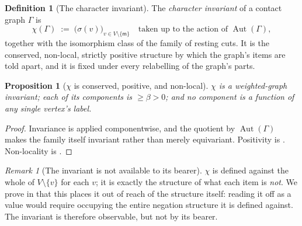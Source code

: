 \documentclass[11pt,twocolumn,a4paper]{article}
\theoremstyle{dirthm}
\newtheorem{proposition}[theorem]{Proposition}
\theoremstyle{definition}
\newtheorem{definition}[theorem]{Definition}
\theoremstyle{remark}
\newtheorem{remark}[theorem]{Remark}
\newcommand{\Gph}{\Gamma}
\newcommand{\V}{V}
\newcommand{\med}{\mathsf{m}}
\newcommand{\flo}{\beta}
\newcommand{\str}{\sigma}
\newcommand{\Char}{\chi}
\newcommand{\set}[1]{\{#1\}}
\DeclareMathOperator{\Aut}{Aut}
\begin{document}
\begin{definition}[The character invariant]
\label{def:char}
The \emph{character invariant} of a contact graph $\Gph$ is
\[
\Char(\Gph)\;:=\;\bigl(\str(v)\bigr)_{v\in\V\setminus\set{\med}}
\quad\text{taken up to the action of }\Aut(\Gph),
\]
together with the isomorphism class of the family of resting cuts. It is the
conserved, non-local, strictly positive structure by which the graph's items
are told apart, and it is fixed under every relabelling of the graph's parts.
\end{definition}

\begin{proposition}[$\Char$ is conserved, positive, and non-local]
\label{prop:char}
$\Char$ is a weighted-graph invariant; each of its components is
$\ge\flo>0$; and no component is a function of any single vertex's label.
\end{proposition}

\begin{proof}
Invariance is  applied componentwise, and the quotient by
$\Aut(\Gph)$ makes the family itself invariant rather than merely
equivariant. Positivity is . Non-locality is
.
\end{proof}

\begin{remark}[The invariant is not available to its bearer]
\label{rem:not-available}
$\Char$ is defined against the whole of $\V\setminus\set{v}$ for each $v$;
it is exactly the structure of what each item is \emph{not}. We prove in
 that this places it out of reach of the structure
itself: reading it off as a value would require occupying the entire negation
structure it is defined against. The invariant is therefore observable, but
not by its bearer.
\end{remark}
\end{document}
